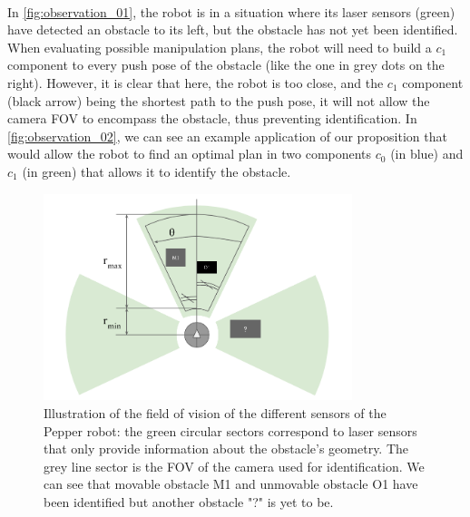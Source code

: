 \paragraph{}In \ref{fig:observation_01}, the robot is in a situation where its laser sensors (green) have detected an obstacle to its left, but the obstacle has not yet been identified. When evaluating possible manipulation plans, the robot will need to build a $c_{1}$ component to every push pose of the obstacle (like the one in grey dots on the right). However, it is clear that here, the robot is too close, and the $c_{1}$ component (black arrow) being the shortest path to the push pose, it will not allow the camera FOV to encompass the obstacle, thus preventing identification. In \ref{fig:observation_02}, we can see an example application of our proposition that would allow the robot to find an optimal plan in two components $c_{0}$ (in blue) and $c_{1}$ (in green) that allows it to identify the obstacle.

\begin{figure}[H]
  \centering
  \includegraphics[width=9cm]{Figures/Observation_Proposition/Robot_Camera_FOV.png}
  \caption{Illustration of the field of vision of the different sensors of the Pepper robot: the green circular sectors correspond to laser sensors that only provide information about the obstacle's geometry. The grey line sector is the FOV of the camera used for identification. We can see that movable obstacle M1 and unmovable obstacle O1 have been identified but another obstacle "?" is yet to be.}
  \label{fig:robot_camera_fov}
\end{figure}

